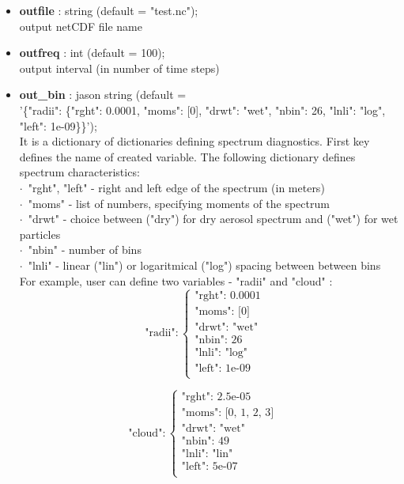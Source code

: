 \documentclass[11pt]{article}
\begin{document}
\begin{itemize}
  \item \textbf{outfile} : string (default = "test.nc"); \\ output netCDF file name
  \item \textbf{outfreq} : int (default = 100); \\ output interval (in number of time steps)
  \item \textbf{out\_bin} : jason string (default =\\ '\{"radii": \{"rght": 0.0001, "moms": [0], "drwt": "wet", "nbin": 26, "lnli": "log", "left": 1e-09\}\}');\\

    \vspace{-.9em}
    It is a dictionary of dictionaries defining spectrum diagnostics.
    First key defines the name of created variable. The following dictionary defines spectrum characteristics:\\
      \indent $\cdot$\ "rght", "left" - right and left edge of the spectrum (in meters)\\
      \indent $\cdot$\ "moms" - list of numbers, specifying moments of the spectrum\\
      \indent $\cdot$\ "drwt" - choice between  ("dry") for dry aerosol spectrum and ("wet") for wet particles\\
      \indent $\cdot$\ "nbin" - number of bins\\
      \indent $\cdot$\ "lnli" - linear ("lin") or logaritmical ("log") spacing between between bins\\
 
    \vspace{-.9em}
    For example, user can define two variables - "radii" and "cloud" : \\ 
  
$$
\mbox{"radii"}: \left\{ \begin{array}{ll}
\mbox{"rght": 0.0001}  & \textrm{}\\
\mbox{"moms": [0]}  & \textrm{}\\
\mbox{"drwt": "wet"} & \textrm{}\\
\mbox{"nbin": 26} & \textrm{}\\
\mbox{"lnli": "log"}  & \textrm{}\\
\mbox{"left": 1e-09} & \textrm{}\\
\end{array} \right.
$$

$$
\mbox{"cloud"}: \left\{ \begin{array}{ll}
\mbox{"rght": 2.5e-05} & \textrm{}\\
\mbox{"moms": [0, 1, 2, 3] } & \textrm{}\\
\mbox{"drwt": "wet"} & \textrm{}\\
\mbox{"nbin": 49} & \textrm{}\\
\mbox{"lnli": "lin"} & \textrm{}\\
\mbox{"left": 5e-07} & \textrm{}\\
\end{array} \right.
$$
 

\end{itemize}
\end{document}
